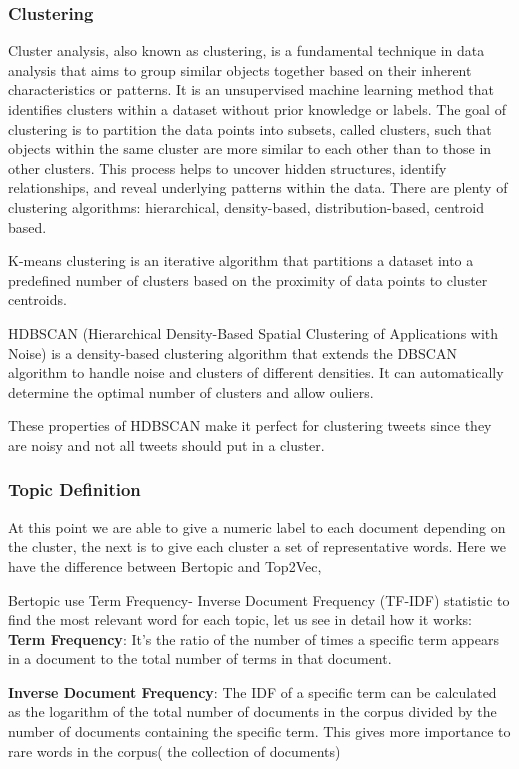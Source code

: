\subsubsection{Clustering}
Cluster analysis, also known as clustering, is a fundamental technique in data analysis that aims to group similar objects together based on their inherent characteristics or patterns. It is an unsupervised machine learning method that identifies clusters within a dataset without prior knowledge or labels. The goal of clustering is to partition the data points into subsets, called clusters, such that objects within the same cluster are more similar to each other than to those in other clusters. This process helps to uncover hidden structures, identify relationships, and reveal underlying patterns within the data. There are plenty of clustering algorithms: hierarchical, density-based, distribution-based, centroid based.

K-means clustering \cite{jin_k-means_2010} is an iterative algorithm that partitions a dataset into a predefined number of clusters based on the proximity of data points to cluster centroids.

HDBSCAN  \cite{mcinnes_hdbscan_2017}(Hierarchical Density-Based Spatial Clustering of Applications with Noise) is a density-based clustering algorithm that extends the DBSCAN algorithm to handle noise and clusters of different densities. It can automatically determine the optimal number of clusters and allow ouliers.

These properties of HDBSCAN make it perfect for clustering tweets since they are noisy and not all tweets should put in a cluster.

\subsubsection{Topic Definition}
At this point we are able to give a numeric label to each document depending on the cluster, the next is to give each cluster a set of representative words.
 Here we have the difference between Bertopic and Top2Vec,

Bertopic use Term Frequency- Inverse Document Frequency (TF-IDF) \cite{rajaraman_data_2011}  statistic to find the most relevant word for each topic, let us see in detail how it works:
\textbf{Term Frequency}: It's the ratio of the number of times a specific term appears in a document to the total number of terms in that document.

\textbf{Inverse Document Frequency}: The IDF of a specific term can be calculated as the logarithm of the total number of documents in the corpus divided by the number of documents containing the specific term. This gives more importance to rare words in the corpus( the collection of documents) 

